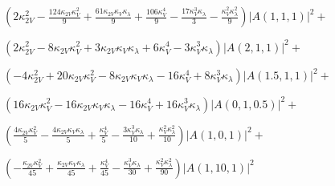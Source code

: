 $
    \left(2 \kappa_{2V}^{2} - \frac{124 \kappa_{2V} \kappa_{V}^{2}}{9} + \frac{61 \kappa_{2V} \kappa_{V} \kappa_{\lambda}}{9} + \frac{106 \kappa_{V}^{4}}{9} - \frac{17 \kappa_{V}^{3} \kappa_{\lambda}}{3} - \frac{\kappa_{V}^{2} \kappa_{\lambda}^{2}}{9}\right) \left|{A{\left(1,1,1 \right)}}\right|^{2} +
$

$
    \left(2 \kappa_{2V}^{2} - 8 \kappa_{2V} \kappa_{V}^{2} + 3 \kappa_{2V} \kappa_{V} \kappa_{\lambda} + 6 \kappa_{V}^{4} - 3 \kappa_{V}^{3} \kappa_{\lambda}\right) \left|{A{\left(2,1,1 \right)}}\right|^{2} +
$

$
    \left(- 4 \kappa_{2V}^{2} + 20 \kappa_{2V} \kappa_{V}^{2} - 8 \kappa_{2V} \kappa_{V} \kappa_{\lambda} - 16 \kappa_{V}^{4} + 8 \kappa_{V}^{3} \kappa_{\lambda}\right) \left|{A{\left(1.5,1,1 \right)}}\right|^{2} +
$

$
    \left(16 \kappa_{2V} \kappa_{V}^{2} - 16 \kappa_{2V} \kappa_{V} \kappa_{\lambda} - 16 \kappa_{V}^{4} + 16 \kappa_{V}^{3} \kappa_{\lambda}\right) \left|{A{\left(0,1,0.5 \right)}}\right|^{2} +
$

$
    \left(\frac{4 \kappa_{2V} \kappa_{V}^{2}}{5} - \frac{4 \kappa_{2V} \kappa_{V} \kappa_{\lambda}}{5} + \frac{\kappa_{V}^{4}}{5} - \frac{3 \kappa_{V}^{3} \kappa_{\lambda}}{10} + \frac{\kappa_{V}^{2} \kappa_{\lambda}^{2}}{10}\right) \left|{A{\left(1,0,1 \right)}}\right|^{2} +
$

$
    \left(- \frac{\kappa_{2V} \kappa_{V}^{2}}{45} + \frac{\kappa_{2V} \kappa_{V} \kappa_{\lambda}}{45} + \frac{\kappa_{V}^{4}}{45} - \frac{\kappa_{V}^{3} \kappa_{\lambda}}{30} + \frac{\kappa_{V}^{2} \kappa_{\lambda}^{2}}{90}\right) \left|{A{\left(1,10,1 \right)}}\right|^{2}
$
